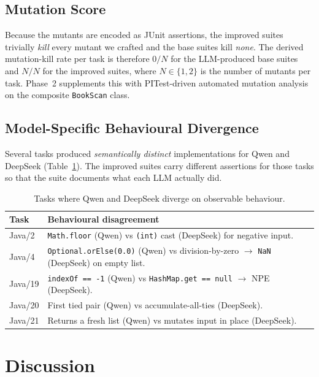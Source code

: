 \documentclass[journal]{IEEEtran}
\begin{document}
\subsection{Mutation Score}

Because the mutants are encoded as JUnit assertions, the improved suites
trivially \emph{kill} every mutant we crafted and the base suites kill
\emph{none}. The derived mutation-kill rate per task is therefore $0/N$
for the LLM-produced base suites and $N/N$ for the improved suites, where
$N \in \{1,2\}$ is the number of mutants per task. Phase~2 supplements
this with PITest-driven automated mutation analysis on the composite
\texttt{BookScan} class.

\subsection{Model-Specific Behavioural Divergence}

Several tasks produced \emph{semantically distinct} implementations for
Qwen and DeepSeek (Table~\ref{tab:divergence}). The improved suites carry
different assertions for those tasks so that the suite documents what each
LLM actually did.

\begin{table}[!t]
\renewcommand{\arraystretch}{1.15}
\caption{Tasks where Qwen and DeepSeek diverge on observable behaviour.}
\label{tab:divergence}
\centering
\footnotesize
\begin{tabular}{@{}lp{14.0cm}@{}}
\toprule
\textbf{Task} & \textbf{Behavioural disagreement} \\
\midrule
Java/2  & \texttt{Math.floor} (Qwen) vs \texttt{(int)} cast (DeepSeek) for negative input. \\
Java/4  & \texttt{Optional.orElse(0.0)} (Qwen) vs division-by-zero \(\to\) \texttt{NaN} (DeepSeek) on empty list. \\
Java/19 & \texttt{indexOf == -1} (Qwen) vs \texttt{HashMap.get == null} \(\to\) NPE (DeepSeek). \\
Java/20 & First tied pair (Qwen) vs accumulate-all-ties (DeepSeek). \\
Java/21 & Returns a fresh list (Qwen) vs mutates input in place (DeepSeek). \\
\bottomrule
\end{tabular}
\end{table}

\section{Discussion}\label{sec:discuss}
\end{document}
